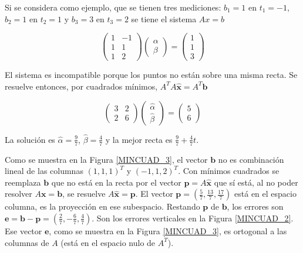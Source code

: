 {\begin{example}
\end{example}

Si se considera como ejemplo, que se tienen tres mediciones:
\noindent
$b_1=1$ en $t_1=-1$, $b_2=1$ en $t_2=1$  y $b_3=3$ en $t_3=2$ se tiene el sistema $Ax=b$

\begin{equation}
\left(\begin{array}{cc} 1 & -1  \\  1 &  1 \\  1 & 2 
\end{array}
 \right) \left(\begin{array}{c} \alpha \\  \beta 
\end{array}
 \right)=  \left(\begin{array}{c} 1    \\  1 \\  3
\end{array}
 \right)
 \label{190}
\end{equation}
 
 El sistema es incompatible porque los puntos no están sobre una misma recta. Se resuelve entonces, por cuadrados mínimos,
  $A^TA  \hat{\textbf{x}}=A^T\textbf{b}$
  
  \begin{equation}
\left(\begin{array}{cc} 3 & 2  \\  2 &  6 
\end{array}
 \right) \left(\begin{array}{c} \hat \alpha \\  \hat \beta 
\end{array}
 \right)=  \left(\begin{array}{c} 5    \\  6 
\end{array}
 \right)
 \label{200}
\end{equation}

\bigskip

La solución es $\hat \alpha= \frac{9}{7}$, $\hat \beta= \frac{4}{7}$ y la mejor recta es $ \frac{9}{7} + \frac{4}{7} t $.

\bigskip

Como se muestra  en la Figura \ref{MINCUAD_3}, el vector $\textbf{b}$ no es combinación lineal de las columnas $( 1,1,1)^T$ y $( -1,1,2)^T$. Con mínimos cuadrados se reemplaza $\textbf{b}$ que no está en la recta  por el vector $\textbf{p}=A \hat{\textbf{x}}$ que sí está, al no poder resolver $A\textbf{x}=\textbf{b}$, se resuelve $A \hat{\textbf{x}} = \textbf{p}$. El vector $\textbf{p}=( \frac{5}{7}, \frac{13}{7} ,\frac{17}{7}  )$  está en el espacio columna, es la proyección en ese subespacio. Restando $\textbf{p}$ de $\textbf{b}$, los errores son $\textbf{e}=\textbf{b}-\textbf{p}=( \frac{2}{7},  -\frac{6}{7}, \frac{4}{7} )$. Son los errores verticales en la Figura \ref{MINCUAD_2}. Ese vector $\textbf{e}$, como se muestra en la  Figura \ref{MINCUAD_3}, es ortogonal a las  columnas de $A$ (está en el espacio nulo de $A^T$).

}
